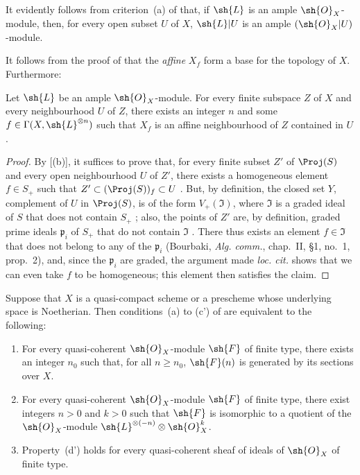 It evidently follows from criterion~(a) of  that, if $\sh{L}$ is an ample $\sh{O}_X$-module, then, for every open subset $U$ of $X$, $\sh{L}|U$ is an ample $(\sh{O}_X|U)$-module.

It follows from the proof of  that the \emph{affine} $X_f$ form a base for the topology of $X$.
Furthermore:

\begin{corollary}[4.5.4]
\label{II.4.5.4}
Let $\sh{L}$ be an ample $\sh{O}_X$-module.
For every finite subspace $Z$ of $X$ and every neighbourhood $U$ of $Z$, there exists an integer $n$ and some $f\in\Gamma(X,\sh{L}^{\otimes n})$ such that $X_f$ is an affine neighbourhood of $Z$ contained in $U$.
\end{corollary}

\begin{proof}
By [(b)], it suffices to prove that, for every finite subset $Z'$ of $\Proj(S)$ and every open neighbourhood $U$ of $Z'$, there exists a homogeneous element $f\in S_+$ such that $Z'\subset(\Proj(S))_f\subset U$ .
But, by definition, the closed set $Y$, complement of $U$ in $\Proj(S)$, is of the form $V_+(\mathfrak{I})$, where $\mathfrak{I}$ is a graded ideal of $S$ that does not contain $S_+$ ;
also, the points of $Z'$ are, by definition, graded prime ideals $\mathfrak{p}_i$ of $S_+$ that do not contain $\mathfrak{I}$ .
There thus exists an element $f\in\mathfrak{I}$ that does not belong to any of the $\mathfrak{p}_i$ (Bourbaki, \emph{Alg. comm.}, chap.~II, \S1, no.~1, prop.~2), and, since the $\mathfrak{p}_i$ are graded, the argument made \emph{loc. cit.} shows that we can even take $f$ to be homogeneous;
this element then satisfies the claim.
\end{proof}

\begin{proposition}[4.5.5]
\label{II.4.5.5}
Suppose that $X$ is a quasi-compact scheme or a prescheme whose underlying space is Noetherian.
Then conditions~(a) to (c') of  are equivalent to the following:
\begin{enumerate}
  \item[\rm{(d)}] For every quasi-coherent $\sh{O}_X$-module $\sh{F}$ of finite type, there exists an integer $n_0$ such that, for all $n\geq n_0$, $\sh{F}(n)$ is generated by its sections over $X$.
  \item[\rm{(d')}] For every quasi-coherent $\sh{O}_X$-module $\sh{F}$ of finite type, there exist integers $n>0$ and $k>0$ such that $\sh{F}$ is isomorphic to a quotient of the $\sh{O}_X$-module $\sh{L}^{\otimes(-n)}\otimes\sh{O}_X^k$.
  \item[\rm{(d'')}] Property~(d') holds for every quasi-coherent sheaf of ideals of $\sh{O}_X$ of finite type.
\end{enumerate}
\end{proposition}

